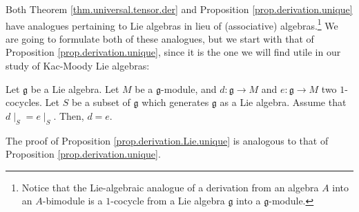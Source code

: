 \documentclass[etingof-lie.tex]{subfiles}
\begin{document}
Both Theorem \ref{thm.universal.tensor.der} and Proposition
\ref{prop.derivation.unique} have analogues pertaining to Lie algebras in lieu
of (associative) algebras.\footnote{Notice that the Lie-algebraic analogue of
a derivation from an algebra $A$ into an $A$-bimodule is a $1$-cocycle from a
Lie algebra $\mathfrak{g}$ into a $\mathfrak{g}$-module.} We are going to
formulate both of these analogues, but we start with that of Proposition
\ref{prop.derivation.unique}, since it is the one we will find utile in our
study of Kac-Moody Lie algebras:

\begin{proposition}
\label{prop.derivation.Lie.unique}Let $\mathfrak{g}$ be a Lie algebra. Let $M$
be a $\mathfrak{g}$-module, and $d:\mathfrak{g}\rightarrow M$ and
$e:\mathfrak{g}\rightarrow M$ two $1$-cocycles. Let $S$ be a subset of
$\mathfrak{g}$ which generates $\mathfrak{g}$ as a Lie algebra. Assume that
$d\mid_{S}=e\mid_{S}$. Then, $d=e$.
\end{proposition}

\begin{vershort}
The proof of Proposition \ref{prop.derivation.Lie.unique} is analogous to that
of Proposition \ref{prop.derivation.unique}.
\end{vershort}
\end{document}

